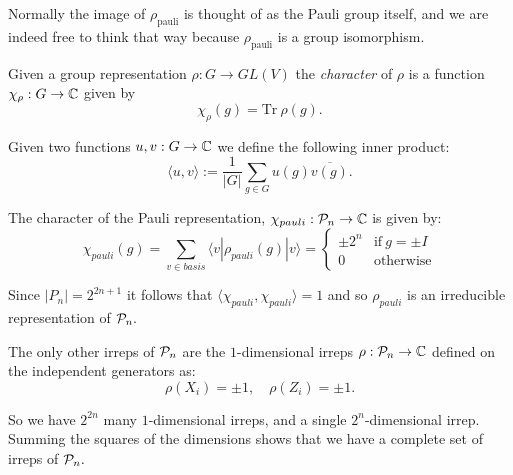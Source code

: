 \documentclass[12pt]{article}
\begin{document}

Normally the image of 
$\rho_{\mathrm{pauli}}$ is thought of as the
Pauli group itself, and we are indeed free to think
that way because $\rho_{\mathrm{pauli}}$ is a group
isomorphism.

Given a group representation $\rho:G\to GL(V)$
the {\it character} of $\rho$ is a function
$\chi_\rho:G\to \mathbb{C}$ given by
$$
    \chi_\rho(g) = \mbox{Tr}\ \rho(g).
$$

Given two functions $u,v : G \to \mathbb{C}$ 
we define the following inner product:
$$
    \langle u, v \rangle := \frac{1}{|G|} \sum_{g\in G} u(g) \overline{v(g)}.
$$

The character of the Pauli representation, $\chi_{{pauli}}:\mathcal{P}_n\to\mathbb{C}$
is given by:
$$
\chi_{{pauli}}(g) = \sum_{v \in basis} \langle v | \rho_{{pauli}}(g) | v \rangle
    = \left\{ \begin{array}{ll}
 \pm 2^n &\mbox{if}\ g=\pm I\\
 0 &\mbox{otherwise}\end{array}\right.
$$

Since $|P_n|=2^{2n+1}$ it follows that
$\langle\chi_{pauli},\chi_{pauli}\rangle = 1$ and
so $\rho_{pauli}$ is an irreducible representation of $\mathcal{P}_n.$

The only other irreps of $\mathcal{P}_n$ are 
the $1$-dimensional irreps $\rho:\mathcal{P}_n\to\mathbb{C}$
defined on the independent generators as:
    $$ \rho(X_i) = \pm 1,\quad \rho(Z_i) = \pm 1.$$

So we have $2^{2n}$ many $1$-dimensional irreps,
and a single $2^n$-dimensional irrep.
Summing the squares of the dimensions
shows that we have a complete set of irreps of $\mathcal{P}_n.$

%
\end{document}

